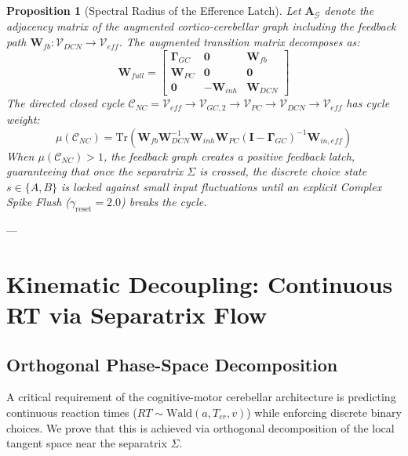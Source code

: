 \documentclass[11pt,a4paper]{article}
\newtheorem{proposition}[theorem]{Proposition}
\begin{document}
\begin{proposition}[Spectral Radius of the Efference Latch]
Let $\mathbf{A}_{\mathcal{G}}$ denote the adjacency matrix of the augmented cortico-cerebellar graph including the feedback path $\mathbf{W}_{fb}: \mathcal{V}_{DCN} \to \mathcal{V}_{eff}$. The augmented transition matrix decomposes as:
\begin{equation}
\mathbf{W}_{full} = \begin{bmatrix}
\mathbf{\Gamma}_{GC} & \mathbf{0} & \mathbf{W}_{fb} \\
\mathbf{W}_{PC} & \mathbf{0} & \mathbf{0} \\
\mathbf{0} & -\mathbf{W}_{inh} & \mathbf{W}_{DCN}
\end{bmatrix}
\end{equation}
The directed closed cycle $\mathcal{C}_{NC} = \mathcal{V}_{eff} \to \mathcal{V}_{GC, 2} \to \mathcal{V}_{PC} \to \mathcal{V}_{DCN} \to \mathcal{V}_{eff}$ has cycle weight:
\begin{equation}
\mu(\mathcal{C}_{NC}) = \text{Tr}\left( \mathbf{W}_{fb} \mathbf{W}_{DCN}^{-1} \mathbf{W}_{inh} \mathbf{W}_{PC} (\mathbf{I} - \mathbf{\Gamma}_{GC})^{-1} \mathbf{W}_{in, eff} \right)
\end{equation}
When $\mu(\mathcal{C}_{NC}) > 1$, the feedback graph creates a positive feedback latch, guaranteeing that once the separatrix $\Sigma$ is crossed, the discrete choice state $s \in \{A, B\}$ is locked against small input fluctuations until an explicit Complex Spike Flush ($\gamma_{\text{reset}} = 2.0$) breaks the cycle.
\end{proposition}

---

\section{Kinematic Decoupling: Continuous RT via Separatrix Flow}

\subsection{Orthogonal Phase-Space Decomposition}
A critical requirement of the cognitive-motor cerebellar architecture is predicting continuous reaction times ($RT \sim \text{Wald}(a, T_{er}, v)$) while enforcing discrete binary choices. We prove that this is achieved via orthogonal decomposition of the local tangent space near the separatrix $\Sigma$.
\end{document}
